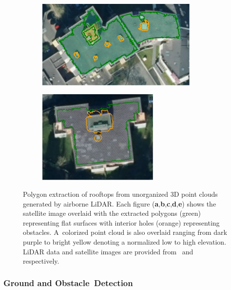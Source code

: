 \begin{figure}[H]
\begin{subfigure}[t]{.55\linewidth}
    \centering\includegraphics[trim=0mm 0mm 0mm 0mm, clip, width=8cm]{chapter_3_polylidar3d/imgs/rooftop/74310126_satellite.pdf}
    \caption{\label{fig:ch3_rooftop_d}}
  \end{subfigure}
  \hfill
  \begin{subfigure}[t]{.40\linewidth}
    \centering\includegraphics[trim=0mm 4mm 0mm 0mm, clip, width=6cm]{chapter_3_polylidar3d/imgs/rooftop/74201616_satellite.pdf}
    \caption{\label{fig:ch3_rooftop_e}}
  \end{subfigure}
  \caption{Polygon extraction of rooftops from unorganized 3D point clouds generated by airborne LiDAR. %
  Each figure (\textbf{a},\textbf{b},\textbf{c},\textbf{d},\textbf{e}) shows the satellite image overlaid with the extracted polygons (green) representing flat surfaces with interior holes (orange) representing obstacles. A~colorized point cloud is also overlaid ranging from dark purple to bright yellow denoting a normalized low to high elevation. LiDAR data and satellite images are provided from~\cite{lidar_germany} and~\cite{satellite_germany} respectively. }\label{fig:ch3_rooftop}
\end{figure}
\unskip





\subsubsection{Ground and Obstacle~Detection}\label{sec:ch3_results_kitti}


